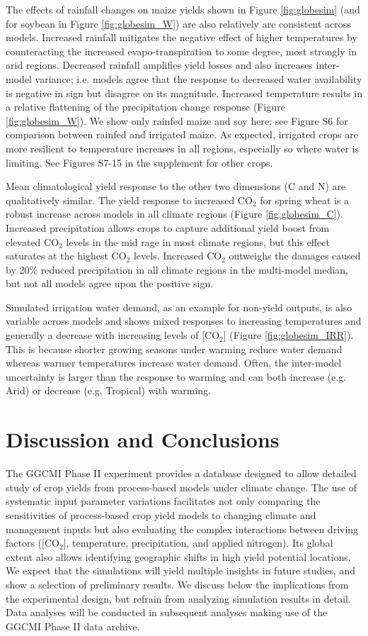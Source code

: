 \documentclass[gmd, manuscript]{copernicus} %
\begin{document}
{The effects of rainfall changes on maize yields shown in Figure \ref{fig:globesim} (and for soybean in Figure \ref{fig:globesim_W}) are also relatively are consistent across models. 
Increased rainfall mitigates the negative effect of higher temperatures by counteracting the increased evapo-transpiration to some degree, most strongly in arid regions.
Decreased rainfall amplifies yield losses and also increases inter-model variance; i.e. models agree that the response to decreased water availability is negative in sign but disagree on its magnitude.
Increased temperature results in a relative flattening of the precipitation change response (Figure \ref{fig:globesim_W}).
We show only rainfed maize and soy here; see Figure S6 for comparison between rainfed and irrigated maize. As expected, irrigated crops are more resilient to temperature increases in all regions, especially so where water is limiting. 
See Figures S7-15 in the supplement for other crops.   

Mean climatological yield response to the other two dimensions (C and N) are qualitatively similar. 
The yield response to increased CO$_2$ for spring wheat is a robust increase across models in all climate regions (Figure \ref{fig:globesim_C}). 
Increased precipitation allows crops to capture additional yield boost from elevated CO$_2$ levels in the mid rage in most climate regions, but this effect saturates at the highest CO$_2$ levels. 
Increased CO$_2$ outweighs the damages caused by 20\% reduced precipitation in all climate regions in the multi-model median, but not all models agree upon the positive sign.

Simulated irrigation water demand, as an example for non-yield outputs, is also variable across models and shows mixed responses to increasing temperatures and generally a decrease with increasing levels of [CO$_2$] (Figure \ref{fig:globesim_IRR}). 
This is because shorter growing seasons under warming reduce water demand whereas warmer temperatures increase water demand. 
Often, the inter-model uncertainty is larger than the response to warming and can both increase (e.g. Arid) or decrease (e.g. Tropical) with warming.

\section{Discussion and Conclusions} 
\label{S:5}
The GGCMI Phase II experiment provides a database designed to allow detailed study of crop yields from process-based models under climate change. 
The use of systematic input parameter variations facilitates not only comparing the sensitivities of process-based crop yield models to changing climate and management inputs but also evaluating the complex interactions between driving factors ([CO$_2$], temperature, precipitation, and applied nitrogen). 
Its global extent also allows identifying geographic shifts in high yield potential locations. 
We expect that the simulations will yield multiple insights in future studies, and show a selection of preliminary results. 
We discuss below the implications from the experimental design, but refrain from analyzing simulation results in detail. 
Data analyses will be conducted in subsequent analyses making use of the GGCMI Phase II data archive.

}
\end{document}

